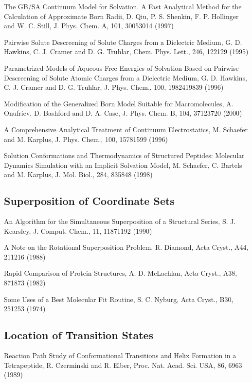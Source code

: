\documentclass[letterpaper,11pt,english]{sphinxmanual}
\begin{document}
The GB/SA Continuum Model for Solvation. A Fast Analytical Method for the Calculation of Approximate Born Radii, D. Qiu, P. S. Shenkin, F. P. Hollinger and W. C. Still, J. Phys. Chem. A, 101, 3005\sphinxhyphen{}3014 (1997)

Pairwise Solute Descreening of Solute Charges from a Dielectric Medium, G. D. Hawkins, C. J. Cramer and D. G. Truhlar, Chem. Phys. Lett., 246, 122\sphinxhyphen{}129 (1995)

Parametrized Models of Aqueous Free Energies of Solvation Based on Pairwise Descreening of Solute Atomic Charges from a Dielectric Medium, G. D. Hawkins, C. J. Cramer and D. G. Truhlar, J. Phys. Chem., 100, 19824\sphinxhyphen{}19839 (1996)

Modification of the Generalized Born Model Suitable for Macromolecules, A. Onufriev, D. Bashford and D. A. Case, J. Phys. Chem. B, 104, 3712\sphinxhyphen{}3720 (2000)

A Comprehensive Analytical Treatment of Continuum Electrostatics, M. Schaefer and M. Karplus, J. Phys. Chem., 100, 1578\sphinxhyphen{}1599 (1996)

Solution Conformations and Thermodynamics of Structured Peptides: Molecular Dynamics Simulation with an Implicit Solvation Model, M. Schaefer, C. Bartels and M. Karplus, J. Mol. Biol., 284, 835\sphinxhyphen{}848 (1998)


\subsection{Superposition of Coordinate Sets}
\label{\detokenize{text/references:superposition-of-coordinate-sets}}
An Algorithm for the Simultaneous Superposition of a Structural Series, S. J. Kearsley, J. Comput. Chem., 11, 1187\sphinxhyphen{}1192 (1990)

A Note on the Rotational Superposition Problem, R. Diamond, Acta Cryst., A44, 211\sphinxhyphen{}216 (1988)

Rapid Comparison of Protein Structures, A. D. McLachlan, Acta Cryst., A38, 871\sphinxhyphen{}873 (1982)

Some Uses of a Best Molecular Fit Routine, S. C. Nyburg, Acta Cryst., B30, 251\sphinxhyphen{}253 (1974)


\subsection{Location of Transition States}
\label{\detokenize{text/references:location-of-transition-states}}
Reaction Path Study of Conformational Transitions and Helix Formation in a Tetrapeptide, R. Czerminski and R. Elber, Proc. Nat. Acad. Sci. USA, 86, 6963 (1989)
\end{document}
